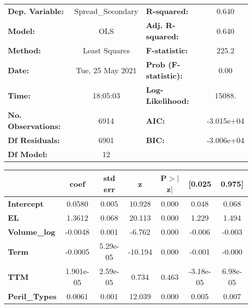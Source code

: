 \begin{center}
\begin{tabular}{lclc}
\toprule
\textbf{Dep. Variable:}           & Spread\_Secondary & \textbf{  R-squared:         } &     0.640   \\
\textbf{Model:}                   &        OLS        & \textbf{  Adj. R-squared:    } &     0.640   \\
\textbf{Method:}                  &   Least Squares   & \textbf{  F-statistic:       } &     225.2   \\
\textbf{Date:}                    &  Tue, 25 May 2021 & \textbf{  Prob (F-statistic):} &     0.00    \\
\textbf{Time:}                    &      18:05:03     & \textbf{  Log-Likelihood:    } &    15088.   \\
\textbf{No. Observations:}        &         6914      & \textbf{  AIC:               } & -3.015e+04  \\
\textbf{Df Residuals:}            &         6901      & \textbf{  BIC:               } & -3.006e+04  \\
\textbf{Df Model:}                &           12      & \textbf{                     } &             \\
\bottomrule
\end{tabular}
\begin{tabular}{lcccccc}
                                  & \textbf{coef} & \textbf{std err} & \textbf{z} & \textbf{P$> |$z$|$} & \textbf{[0.025} & \textbf{0.975]}  \\
\midrule
\textbf{Intercept}                &       0.0580  &        0.005     &    10.928  &         0.000        &        0.048    &        0.068     \\
\textbf{EL}                       &       1.3612  &        0.068     &    20.113  &         0.000        &        1.229    &        1.494     \\
\textbf{Volume\_log}              &      -0.0048  &        0.001     &    -6.762  &         0.000        &       -0.006    &       -0.003     \\
\textbf{Term}                     &      -0.0005  &     5.29e-05     &   -10.194  &         0.000        &       -0.001    &       -0.000     \\
\textbf{TTM}                      &    1.901e-05  &     2.59e-05     &     0.734  &         0.463        &    -3.18e-05    &     6.98e-05     \\
\textbf{Peril\_Types}             &       0.0061  &        0.001     &    12.039  &         0.000        &        0.005    &        0.007     \\

\end{tabular}
\end{center}
